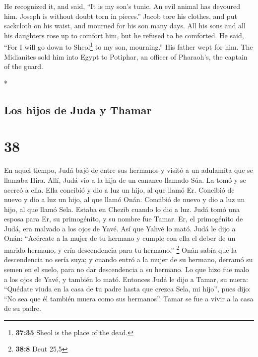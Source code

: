 \begin{paracol}{2}
\begin{otherlanguage}{english}
 He recognized it, and said, ``It is my son's tunic. An
evil animal has devoured him. Joseph is without doubt torn in pieces.''
 Jacob tore his clothes, and put sackcloth on his waist,
and mourned for his son many days.  All his sons and all
his daughters rose up to comfort him, but he refused to be comforted. He
said, ``For I will go down to Sheol\footnote{\textbf{37:35} Sheol is the
  place of the dead.} to my son, mourning.'' His father wept for him.
 The Midianites sold him into Egypt to Potiphar, an
officer of Pharaoh's, the captain of the guard.

\end{otherlanguage}

\switchcolumn[0]*

\hypertarget{los-hijos-de-juda-y-thamar}{%
\subsection{Los hijos de Juda y
Thamar}\label{los-hijos-de-juda-y-thamar}}

\hypertarget{section-74}{%
\section{38}\label{section-74}}

 En aquel tiempo, Judá bajó de entre sus hermanos y visitó
a un adulamita que se llamaba Hira.  Allí, Judá vio a la
hija de un cananeo llamado Súa. La tomó y se acercó a ella.
 Ella concibió y dio a luz un hijo, al que llamó Er.
 Concibió de nuevo y dio a luz un hijo, al que llamó Onán.
 Concibió de nuevo y dio a luz un hijo, al que llamó Sela.
Estaba en Chezib cuando lo dio a luz.  Judá tomó una
esposa para Er, su primogénito, y su nombre fue Tamar. 
Er, el primogénito de Judá, era malvado a los ojos de Yavé. Así que
Yahvé lo mató.  Judá le dijo a Onán: ``Acércate a la mujer
de tu hermano y cumple con ella el deber de un marido hermano, y cría
descendencia para tu hermano.'' \footnote{\textbf{38:8} Deut 25,5}
 Onán sabía que la descendencia no sería suya; y cuando
entró a la mujer de su hermano, derramó su semen en el suelo, para no
dar descendencia a su hermano.  Lo que hizo fue malo a
los ojos de Yavé, y también lo mató.  Entonces Judá le
dijo a Tamar, su nuera: ``Quédate viuda en la casa de tu padre hasta que
crezca Sela, mi hijo'', pues dijo: ``No sea que él también muera como
sus hermanos''. Tamar se fue a vivir a la casa de su padre.


\end{paracol}
